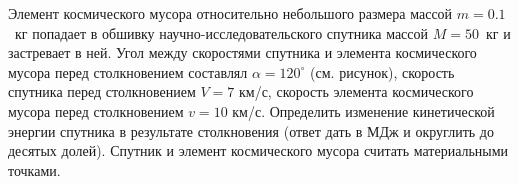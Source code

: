 
Элемент космического мусора относительно небольшого размера массой \linebreak $m=0.1$~кг попадает в обшивку 
научно-исследовательского спутника массой \linebreak $M=50$~кг и застревает в ней. Угол между скоростями спутника и элемента 
космического мусора перед столкновением составлял $\alpha=120^{\circ}$ (см. рисунок), скорость спутника перед 
столкновением $V=7$ км/с, скорость элемента космического мусора перед столкновением $v=10$ км/с. Определить 
изменение кинетической энергии спутника в результате столкновения (ответ дать в МДж и округлить до десятых долей). 
Спутник и элемент космического мусора считать материальными точками.

